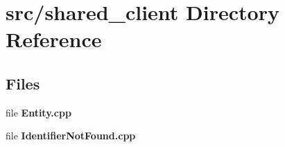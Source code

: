 \section{src/shared\+\_\+client Directory Reference}
\label{dir_79727b49989ab7634de1e90dbedf0f74}
\subsection*{Files}
\begin{DoxyCompactItemize}
\item 
file {\bf Entity.\+cpp}
\item 
file {\bf Identifier\+Not\+Found.\+cpp}
\end{DoxyCompactItemize}
